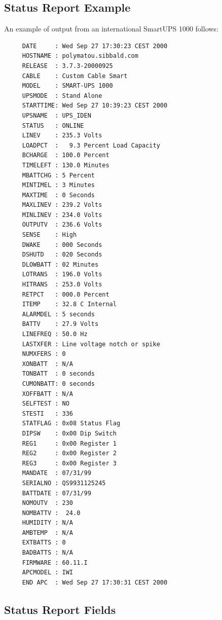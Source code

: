 {{{{{{{{\label{Status-Report-Example}

\subsection*{Status Report Example}

\label{index-Examples_002c-Status-Report-254}
\label{index-Status-255}
An example of output from an international SmartUPS 1000 follows: 

\footnotesize
\begin{verbatim}
     DATE     : Wed Sep 27 17:30:23 CEST 2000
     HOSTNAME : polymatou.sibbald.com
     RELEASE  : 3.7.3-20000925
     CABLE    : Custom Cable Smart
     MODEL    : SMART-UPS 1000
     UPSMODE  : Stand Alone
     STARTTIME: Wed Sep 27 10:39:23 CEST 2000
     UPSNAME  : UPS_IDEN
     STATUS   : ONLINE
     LINEV    : 235.3 Volts
     LOADPCT  :   9.3 Percent Load Capacity
     BCHARGE  : 100.0 Percent
     TIMELEFT : 130.0 Minutes
     MBATTCHG : 5 Percent
     MINTIMEL : 3 Minutes
     MAXTIME  : 0 Seconds
     MAXLINEV : 239.2 Volts
     MINLINEV : 234.0 Volts
     OUTPUTV  : 236.6 Volts
     SENSE    : High
     DWAKE    : 000 Seconds
     DSHUTD   : 020 Seconds
     DLOWBATT : 02 Minutes
     LOTRANS  : 196.0 Volts
     HITRANS  : 253.0 Volts
     RETPCT   : 000.0 Percent
     ITEMP    : 32.8 C Internal
     ALARMDEL : 5 seconds
     BATTV    : 27.9 Volts
     LINEFREQ : 50.0 Hz
     LASTXFER : Line voltage notch or spike
     NUMXFERS : 0
     XONBATT  : N/A
     TONBATT  : 0 seconds
     CUMONBATT: 0 seconds
     XOFFBATT : N/A
     SELFTEST : NO
     STESTI   : 336
     STATFLAG : 0x08 Status Flag
     DIPSW    : 0x00 Dip Switch
     REG1     : 0x00 Register 1
     REG2     : 0x00 Register 2
     REG3     : 0x00 Register 3
     MANDATE  : 07/31/99
     SERIALNO : QS9931125245
     BATTDATE : 07/31/99
     NOMOUTV  : 230
     NOMBATTV :  24.0
     HUMIDITY : N/A
     AMBTEMP  : N/A
     EXTBATTS : 0
     BADBATTS : N/A
     FIRMWARE : 60.11.I
     APCMODEL : IWI
     END APC  : Wed Sep 27 17:30:31 CEST 2000
\end{verbatim}
\normalsize

\label{Status-Report-Fields}

\subsection*{Status Report Fields}

}}}}}}}}
